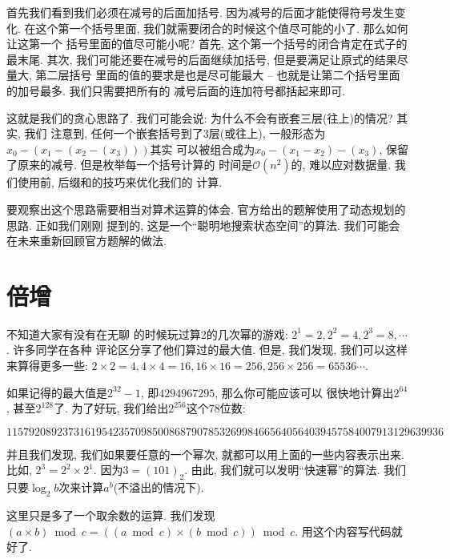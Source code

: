 首先我们看到我们必须在减号的后面加括号. 因为减号的后面才能使得符号发生变化. 
在这个第一个括号里面, 我们就需要闭合的时候这个值尽可能的小了. 那么如何让这第一个
括号里面的值尽可能小呢? 首先, 这个第一个括号的闭合肯定在式子的最末尾. 
其次, 我们可能还要在减号的后面继续加括号, 但是要满足让原式的结果尽量大, 第二层括号
里面的值的要求是也是尽可能最大 -- 也就是让第二个括号里面的加号最多. 我们只需要把所有的
减号后面的连加符号都括起来即可. 

这就是我们的贪心思路了. 我们可能会说: 为什么不会有嵌套三层(往上)的情况? 其实, 我们 
注意到, 任何一个嵌套括号到了3层(或往上), 一般形态为$x_0-(x_1-(x_2-(x_3)))$其实
可以被组合成为$x_0-(x_1-x_2)-(x_3)$, 保留了原来的减号. 但是枚举每一个括号计算的
时间是$\mathcal O(n^2)$的, 难以应对数据量. 我们使用前, 后缀和的技巧来优化我们的
计算. 

要观察出这个思路需要相当对算术运算的体会. 官方给出的题解使用了动态规划的思路. 
正如我们刚刚
提到的, 这是一个``聪明地搜索状态空间''的算法. 我们可能会在未来重新回顾官方题解的做法.

\section{倍增}

 不知道大家有没有在无聊
的时候玩过算2的几次幂的游戏: $2^1=2, 2^2=4, 2^3=8, \cdots$. 许多同学在各种
评论区分享了他们算过的最大值. 但是, 我们发现, 我们可以这样来算得更多一些: 
$2\times 2=4, 4\times 4 = 16, 16\times 16=256, 256\times 256=65536\cdots$. 

如果记得的最大值是$2^{32}-1$, 即$4294967295$, 那么你可能应该可以
很快地计算出$2^{64}$, 甚至$2^{128}$了. 为了好玩, 我们给出$2^{256}$这个78位数: 

$$
115792089237316195423570985008687907853269984665640564039457584007913129639936
$$

并且我们发现, 我们如果要任意的一个幂次, 就都可以用上面的一些内容表示出来. 比如, $2^3=2^2\times 2^1$.
因为$3=(101)_2$. 由此, 我们就可以发明``快速幂''的算法. 我们只要$\log_2 b$次来计算$a^b$(不溢出的情况下).

 这里只是多了一个取余数的运算. 我们发现
$(a\times b)\bmod c = ((a\bmod c)\times (b\bmod c))\bmod c$. 用这个内容写代码就好了. 


